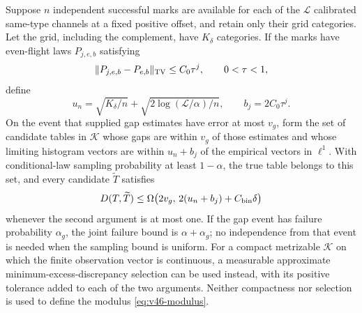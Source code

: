 \begin{corollary}
\label{cor:v46-confidence}
Suppose $n$ independent successful marks are available for each of the
$\mathcal L$ calibrated same-type channels at a fixed positive offset, and
retain only their grid categories.  Let the grid, including the complement,
have $K_\delta$ categories.  If the marks have even-flight laws $P_{j,e,b}$
satisfying
\begin{equation}\label{eq:v46-finite-law-bias}
 \|P_{j,e,b}-P_{e,b}\|_{\rm TV}\le C_0\tau^j,
 \qquad 0<\tau<1,
\end{equation}
define
\[
 u_n=\sqrt{K_\delta/n}+
              \sqrt{2\log(\mathcal L/\alpha)/n},
 \qquad b_j=2C_0\tau^j.
\]
On the event that supplied gap estimates have error at most $v_g$, form the
set of candidate tables in $\mathcal K$ whose gaps are within $v_g$ of
those estimates and whose limiting histogram vectors are within $u_n+b_j$
of the empirical vectors in $\ell^1$.  With conditional-law sampling
probability at least $1-\alpha$, the true table belongs to this set, and
every candidate $\widetilde T$ satisfies
\begin{equation}\label{eq:v46-confidence-radius}
 D(T,\widetilde T)\le
 \Omega\bigl(2v_g,\,2(u_n+b_j)+C_{\rm bin}\delta\bigr)
\end{equation}
whenever the second argument is at most one.  If the gap event has failure
probability $\alpha_g$, the joint failure bound is $\alpha+\alpha_g$;
no independence from that event is needed when the sampling bound is uniform.
For a compact metrizable $\mathcal K$ on which the finite observation
vector is continuous, a measurable approximate minimum-excess-discrepancy
selection can be used instead, with its positive tolerance added to each
of the two arguments.  Neither compactness nor selection is used to define
the modulus \eqref{eq:v46-modulus}.
\end{corollary}

